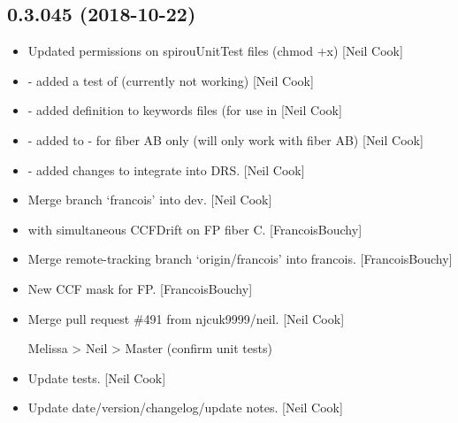 \documentclass[a4paper,10pt,english]{report}
\begin{document}
\subsection{0.3.045 (2018-10-22)}
\label{\detokenize{misc/changelog:id286}}\begin{itemize}
\item {} 
Updated permissions on spirouUnitTest files (chmod +x) {[}Neil Cook{]}

\item {} 
 - added a test of  (currently
not working) {[}Neil Cook{]}

\item {} 
 - added  definition to keywords files
(for use in  {[}Neil Cook{]}

\item {} 
 - added  to  -
for fiber AB only (will only work with fiber AB) {[}Neil Cook{]}

\item {} 
 - added changes to integrate into DRS. {[}Neil
Cook{]}

\item {} 
Merge branch ‘francois’ into dev. {[}Neil Cook{]}

\item {} 
 with simultaneous CCFDrift on FP fiber C.
{[}FrancoisBouchy{]}

\item {} 
Merge remote-tracking branch ‘origin/francois’ into francois.
{[}FrancoisBouchy{]}

\item {} 
New CCF mask for FP. {[}FrancoisBouchy{]}

\item {} 
Merge pull request \#491 from njcuk9999/neil. {[}Neil Cook{]}

Melissa \textendash{}\textgreater{} Neil \textendash{}\textgreater{} Master (confirm unit tests)

\item {} 
Update tests. {[}Neil Cook{]}

\item {} 
Update date/version/changelog/update notes. {[}Neil Cook{]}

\end{itemize}
\end{document}
